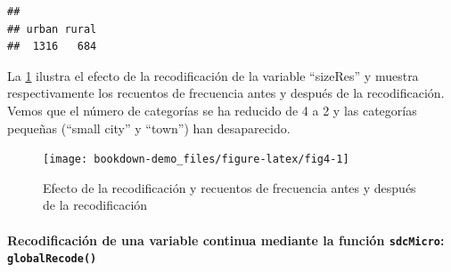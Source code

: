 \documentclass[]{book}
\newenvironment{Shaded}{\begin{snugshade}}{\end{snugshade}}
\newcommand{\CommentTok}[1]{\textcolor[rgb]{0.56,0.35,0.01}{\textit{#1}}}
\newcommand{\DataTypeTok}[1]{\textcolor[rgb]{0.13,0.29,0.53}{#1}}
\newcommand{\KeywordTok}[1]{\textcolor[rgb]{0.13,0.29,0.53}{\textbf{#1}}}
\newcommand{\NormalTok}[1]{#1}
\newcommand{\OperatorTok}[1]{\textcolor[rgb]{0.81,0.36,0.00}{\textbf{#1}}}
\newcommand{\StringTok}[1]{\textcolor[rgb]{0.31,0.60,0.02}{#1}}
\let\oldparagraph\paragraph
\renewcommand{\paragraph}[1]{\oldparagraph{#1}\mbox{}}
\theoremstyle{definition}
\theoremstyle{definition}
\theoremstyle{definition}
\theoremstyle{definition}
\theoremstyle{remark}
\begin{document}
\begin{Shaded}
\end{Shaded}

\begin{verbatim}
## 
## urban rural 
##  1316   684
\end{verbatim}

La \ref{fig:fig4} ilustra el efecto de la recodificación de la variable ``sizeRes'' y muestra respectivamente los recuentos de frecuencia antes y después de la recodificación. Vemos que el número de categorías se ha reducido de 4 a 2 y las categorías pequeñas (``small city'' y ``town'') han desaparecido.

\begin{figure}
\texttt{[image: bookdown-demo\_files/figure-latex/fig4-1]} \caption{Efecto de la recodificación y recuentos de frecuencia antes y después de la recodificación}\label{fig:fig4}
\end{figure}

\hypertarget{recodificaciuxf3n-de-una-variable-continua-mediante-la-funciuxf3n-sdcmicro-globalrecode}{%
\paragraph{\texorpdfstring{Recodificación de una variable continua mediante la función \texttt{sdcMicro}: \texttt{globalRecode()}}{Recodificación de una variable continua mediante la función sdcMicro: globalRecode()}}\label{recodificaciuxf3n-de-una-variable-continua-mediante-la-funciuxf3n-sdcmicro-globalrecode}}
\end{document}
